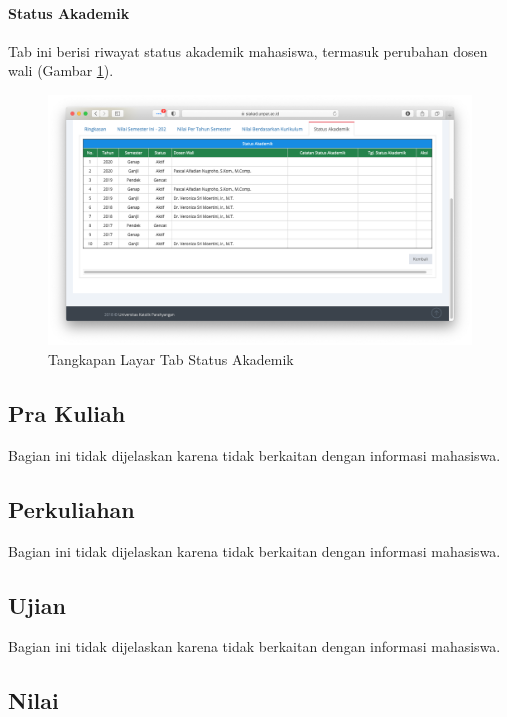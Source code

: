 \paragraph{Status Akademik} Tab ini berisi riwayat status akademik mahasiswa, termasuk perubahan dosen wali (Gambar \ref{fig:3_siakad_akademik_statusakademik}).

\begin{figure}[H]
    \centering
    \includegraphics[scale=0.35]{Gambar/siakad_akademik_statusakademik.png}
    \caption{Tangkapan Layar Tab Status Akademik}
    \label{fig:3_siakad_akademik_statusakademik}
\end{figure}

\subsection{Pra Kuliah}

Bagian ini tidak dijelaskan karena tidak berkaitan dengan informasi mahasiswa.

\subsection{Perkuliahan}

Bagian ini tidak dijelaskan karena tidak berkaitan dengan informasi mahasiswa.

\subsection{Ujian}

Bagian ini tidak dijelaskan karena tidak berkaitan dengan informasi mahasiswa.

\subsection{Nilai}

